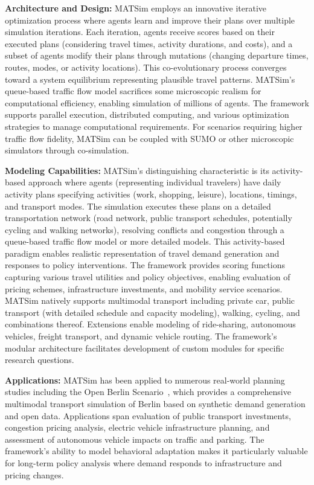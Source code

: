 \textbf{Architecture and Design:} MATSim employs an innovative iterative optimization process where agents learn and improve their plans over multiple simulation iterations. Each iteration, agents receive scores based on their executed plans (considering travel times, activity durations, and costs), and a subset of agents modify their plans through mutations (changing departure times, routes, modes, or activity locations). This co-evolutionary process converges toward a system equilibrium representing plausible travel patterns. MATSim's queue-based traffic flow model sacrifices some microscopic realism for computational efficiency, enabling simulation of millions of agents. The framework supports parallel execution, distributed computing, and various optimization strategies to manage computational requirements. For scenarios requiring higher traffic flow fidelity, MATSim can be coupled with SUMO or other microscopic simulators through co-simulation.

\textbf{Modeling Capabilities:} MATSim's distinguishing characteristic is its activity-based approach where agents (representing individual travelers) have daily activity plans specifying activities (work, shopping, leisure), locations, timings, and transport modes. The simulation executes these plans on a detailed transportation network (road network, public transport schedules, potentially cycling and walking networks), resolving conflicts and congestion through a queue-based traffic flow model or more detailed models. This activity-based paradigm enables realistic representation of travel demand generation and responses to policy interventions. The framework provides scoring functions capturing various travel utilities and policy objectives, enabling evaluation of pricing schemes, infrastructure investments, and mobility service scenarios. MATSim natively supports multimodal transport including private car, public transport (with detailed schedule and capacity modeling), walking, cycling, and combinations thereof. Extensions enable modeling of ride-sharing, autonomous vehicles, freight transport, and dynamic vehicle routing. The framework's modular architecture facilitates development of custom modules for specific research questions.

\textbf{Applications:} MATSim has been applied to numerous real-world planning studies including the Open Berlin Scenario~\cite{matsim_application}, which provides a comprehensive multimodal transport simulation of Berlin based on synthetic demand generation and open data. Applications span evaluation of public transport investments, congestion pricing analysis, electric vehicle infrastructure planning, and assessment of autonomous vehicle impacts on traffic and parking. The framework's ability to model behavioral adaptation makes it particularly valuable for long-term policy analysis where demand responds to infrastructure and pricing changes.


